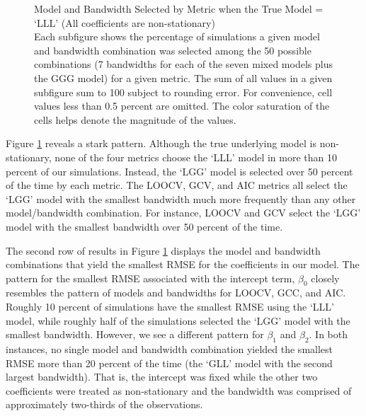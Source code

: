 \documentclass{article}\usepackage[]{graphicx}\usepackage[]{color}
\begin{document}
\begin{figure}
\caption{Model and Bandwidth Selected by Metric when the True Model = `LLL' (All coefficients are non-stationary) \\ Each subfigure shows the percentage of simulations a given model and bandwidth combination was selected among the 50 possible combinations (7 bandwidths for each of the seven mixed models plus the GGG model) for a given metric. The sum of all values in a given subfigure sum to 100 subject to rounding error. For convenience, cell values less than 0.5 percent are omitted. The color saturation of the cells helps denote the magnitude of the values.}
\label{fig:LLLmodelBandwidths}
\end{figure}

Figure \ref{fig:LLLmodelBandwidths} reveals a stark pattern. Although the true underlying model is non-stationary, none of the four metrics choose the `LLL' model in more than 10 percent of our simulations. Instead, the `LGG' model is selected over 50 percent of the time by each metric. The LOOCV, GCV, and AIC metrics all select the `LGG' model with the smallest bandwidth much more frequently than any other model/bandwidth combination. For instance, LOOCV and GCV select the `LGG' model with the smallest bandwidth over 50 percent of the time. 

The second row of results in Figure \ref{fig:LLLmodelBandwidths} displays the model and bandwidth combinations that yield the smallest RMSE for the coefficients in our model. The pattern for the smallest RMSE associated with the intercept term, $\beta _0$ closely resembles the pattern of models and bandwidths for LOOCV, GCC, and AIC. Roughly 10 percent of simulations have the smallest RMSE using the `LLL' model, while roughly half of the simulations selected the `LGG' model with the smallest bandwidth. However, we see a different pattern for $\beta _1$ and $\beta _2$. In both instances, no single model and bandwidth combination yielded the smallest RMSE more than 20 percent of the time (the `GLL' model with the second largest bandwidth). That is, the intercept was fixed while the other two coefficients were treated as non-stationary and the bandwidth was comprised of approximately two-thirds of the observations. 
\end{document}
